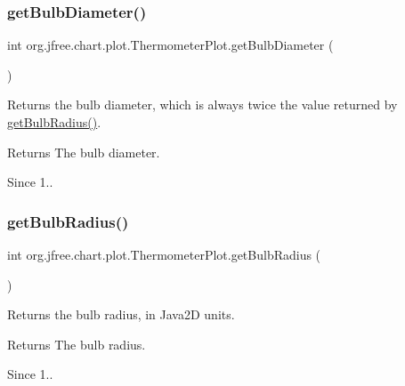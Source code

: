 \subsubsection{\texorpdfstring{get\+Bulb\+Diameter()}{getBulbDiameter()}}
{\footnotesize\ttfamily int org.\+jfree.\+chart.\+plot.\+Thermometer\+Plot.\+get\+Bulb\+Diameter (\begin{DoxyParamCaption}{ }\end{DoxyParamCaption})}

Returns the bulb diameter, which is always twice the value returned by \mbox{\hyperlink{classorg_1_1jfree_1_1chart_1_1plot_1_1_thermometer_plot_a37a2c1afb3ae05c507d06c96ca60741e}{get\+Bulb\+Radius()}}.

\begin{DoxyReturn}{Returns}
The bulb diameter.
\end{DoxyReturn}
\begin{DoxySince}{Since}
1.. 
\end{DoxySince}
\mbox{\label{classorg_1_1jfree_1_1chart_1_1plot_1_1_thermometer_plot_a37a2c1afb3ae05c507d06c96ca60741e}} 
\subsubsection{\texorpdfstring{get\+Bulb\+Radius()}{getBulbRadius()}}
{\footnotesize\ttfamily int org.\+jfree.\+chart.\+plot.\+Thermometer\+Plot.\+get\+Bulb\+Radius (\begin{DoxyParamCaption}{ }\end{DoxyParamCaption})}

Returns the bulb radius, in Java2D units.

\begin{DoxyReturn}{Returns}
The bulb radius.
\end{DoxyReturn}
\begin{DoxySince}{Since}
1.. 
\end{DoxySince}
\mbox{\label{classorg_1_1jfree_1_1chart_1_1plot_1_1_thermometer_plot_a2acfcde8d30779ac772e20ff81823598}} 
